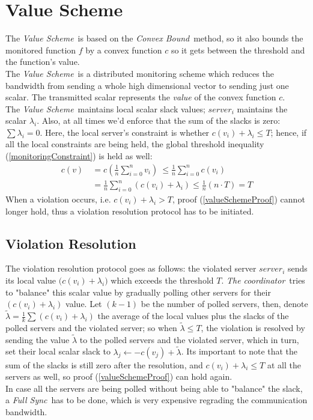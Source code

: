 \documentclass[10pt, conference]{IEEEtran}
\newcommand{\valueScheme}{\textit{Value Scheme}}
\newcommand{\fullSync}{\textit{Full Sync}}
\newcommand{\convexBound}{\textit{Convex Bound}}
\newcommand{\TheCoordinator}{\textit{The coordinator}}
\begin{document}
\section{Value Scheme}
The \valueScheme \ is based on the \convexBound \ method, so it also bounds the monitored function $f$ by a convex function $c$ so it gets between the threshold and the function's value. \\ 
The \valueScheme \ is a distributed monitoring scheme which reduces the bandwidth from sending a whole high dimensional vector to sending just one scalar. The transmitted scalar represents the \textit{value} of the convex function $c$.\\
The \valueScheme \ maintains local scalar slack values; $server_i$ maintains the scalar $\lambda _i$. Also, at all times we'd enforce that the sum of the slacks is zero: ${\sum{\lambda _i} = 0}$. Here, the local server's constraint is whether ${c(v_i) + \lambda _i \leq T}$; hence, if all the local constraints are being held, the global threshold inequality (\ref{monitoringConstraint}) is held as well:
\begin{equation}
\label{valueSchemeProof}
\begin{aligned}
 c(v)  \
	    &=   c\left(\frac{1}{n} \sum\limits_{i=0}^{n}{v_i}\right)  \
       \leq   \frac{1}{n} \sum\limits_{i=0}^{n}c(v_i) \\
        &=    \frac{1}{n} \sum\limits_{i=0}^{n}{(c(v_i) + \lambda _i)}
       \leq   \frac{1}{n}(n \cdot T)
        = T
\end{aligned}
\end{equation}
When a violation occurs, i.e. ${c(v_i) + \lambda _i > T}$, proof (\ref{valueSchemeProof}) cannot longer hold, thus a violation resolution protocol has to be initiated.
\subsection{Violation Resolution}
The violation resolution protocol goes as follows: the violated server $server_i$ sends its local value ${(c(v_i) + \lambda _i})$ which exceeds the threshold $T$. \TheCoordinator \ tries to "balance" this scalar value by gradually polling other servers for their ${(c(v_i) + \lambda _i)}$ value. Let ${(k-1)}$ be the number of polled servers, then, denote ${\widetilde{\lambda} = \frac{1}{k}\sum{(c(v_i) + \lambda _i)}}$ the average of the local values plus the slacks of the polled servers and the violated server; so when ${\widetilde{\lambda} \leq T}$, the violation is resolved by sending the value $\widetilde{\lambda}$ to the polled servers and the violated server, which in turn, set their local scalar slack to ${\lambda _j \leftarrow -c(v_j) + \widetilde{\lambda} }$. Its important to note that the sum of the slacks is still zero after the resolution, and ${c(v_i) + \lambda _i \leq T}$ at all the servers as well, so proof (\ref{valueSchemeProof}) can hold again. \\
In case all the servers are being polled without being able to "balance" the slack, a \fullSync \ has to be done, which is very expensive regrading the communication bandwidth.
\end{document}
